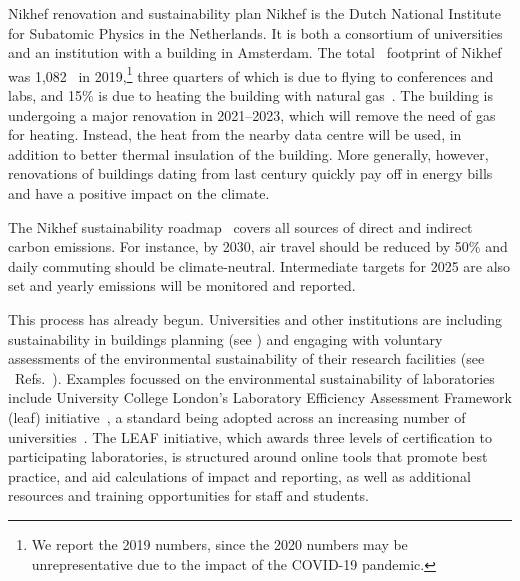 \documentclass[../SustainableHEP.tex]{subfiles}
\begin{document}

\begin{bestpractice}{Nikhef renovation and sustainability plan}%
    Nikhef is the Dutch National Institute for Subatomic Physics in the Netherlands. It is both a consortium of universities and an institution with a building in Amsterdam. The total \CdO\ footprint of Nikhef was 1,082 \tCdOe\ in 2019,\footnote{We report the 2019 numbers, since the 2020 numbers may be unrepresentative due to the impact of the COVID-19 pandemic.} three quarters of which is due to flying to conferences and labs, and 15\% is due to heating the building with natural gas~\cite{Nikhef}. The building is undergoing a major renovation in 2021--2023, which will remove the need of gas for heating. Instead, the heat from the nearby data centre will be used, in addition to better thermal insulation of the building. More generally, however, renovations of buildings dating from last century quickly pay off in energy bills and have a positive impact on the climate.

    The Nikhef sustainability roadmap~\cite{Nikhef} covers all sources of direct and indirect carbon emissions. For instance, by 2030, air travel should be reduced by 50\% and daily commuting should be climate-neutral.  Intermediate targets for 2025 are also set and yearly emissions will be monitored and reported.
\end{bestpractice}


This process has already begun. Universities and other institutions are including sustainability in buildings planning (see ) and engaging with voluntary assessments of the environmental sustainability of their research facilities (see \eg~Refs.~\cite{Environment:2737239, Jahnke2020, Beisert2020, Nikhef, FermilabEnvReport2019}). Examples focussed on the environmental sustainability of laboratories include University College London’s Laboratory Efficiency Assessment Framework (\acrshort{leaf}) initiative~\cite{LEAF_framework, LEAF_take_part}, a standard being adopted across an increasing number of universities~\cite{LEAF_impact}. The LEAF initiative, which awards three levels of certification to participating laboratories, is structured around online tools that promote best practice, and aid calculations of impact and reporting, as well as additional resources and training opportunities for staff and students. 
\end{document}
